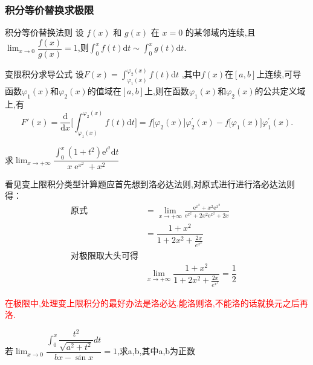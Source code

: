 \documentclass[8pt a4paper, oneside, UTF8]{ctexbook}
\begin{document}
\begin{sloppypar}
    \subsubsection{积分等价替换求极限}
    \begin{defn}{积分等价替换法则}{}
        设 $f(x)$ 和 $g(x)$ 在 $x=0$ 的某邻域内连续,且$\operatorname*{lim}_{x\rightarrow0}\dfrac{f(x)}{g(x)}=1$,则$\int_{0}^{x}f(t)\mathrm{d}t\sim\int_{0}^{x}g(t)\mathrm{d}t.$ \label{BSXJF1}
    \end{defn}
    \begin{defn}{变限积分求导公式}{}
        设$F( x) = \int _{\varphi_1( x) }^{\varphi_2( x) }f( t) $d$t$ ,其中$f(x)$在$[a,b]$上连续,可导函数$\varphi_1(x)$和$\varphi_2(x)$的值域在$[a,b]$上,则在函数$\varphi_1(x)$和$\varphi_2(x)$的公共定义域上,有
        $$
            F'(x)=\frac{\mathrm{d}}{\mathrm{d}x}\biggl[\int_{\varphi_{1}(x)}^{\varphi_{2}(x)}f(t)\mathrm{d}t\biggr]=f\bigl[\varphi_{2}(x)\bigr]\varphi_{2}^{\prime}(x)-f\bigl[\varphi_{1}(x)\bigr]\varphi_{1}^{\prime}(x).
        $$
    \end{defn}
    \begin{problem}
    求$\lim_{x\to+\infty}\dfrac{\int_0^x(1+t^2)\mathrm{e}^{t^2}\mathrm{d}t}{x\operatorname{e}^{x^2}+x^2}$
    \end{problem}
    \begin{solution}
        看见变上限积分类型计算题应首先想到洛必达法则,对原式进行进行洛必达法则得：
        \begin{align*}
            \text{原式}       & =\lim_{x\to+\infty}\frac{\mathrm{e}^{x^2}+{x^2\mathrm{e}^{x^2}}}{\mathrm{e}^{x^2}+2x^2\mathrm{e}^{x^2}+2x} & \\
                            & =\dfrac{1+x^2}{1+2x^2+\frac{2x}{e^{x^2}}}                                                                  & \\
            \text{对极限取大头可得} &                                                                                                              \\
                            & \lim_{x\to +\infty} \dfrac{1+x^2}{1+2x^2+\frac{2x}{e^{x^2}}} = \dfrac{1}{2}
        \end{align*}
    \end{solution}
    \begin{note}
        \textcolor{red}{在极限中,处理变上限积分的最好办法是洛必达.能洛则洛,不能洛的话就换元之后再洛.}
    \end{note}
    \begin{problem}
    若$\operatorname*{lim}_{x \to 0}\dfrac{\int_{0}^{x}\dfrac{t^{2}}{\sqrt{a^{2}+t^{2}}}dt}{bx-\sin x}=1$,求a,b,其中a,b为正数

\end{problem}
\end{sloppypar}
\end{document}
